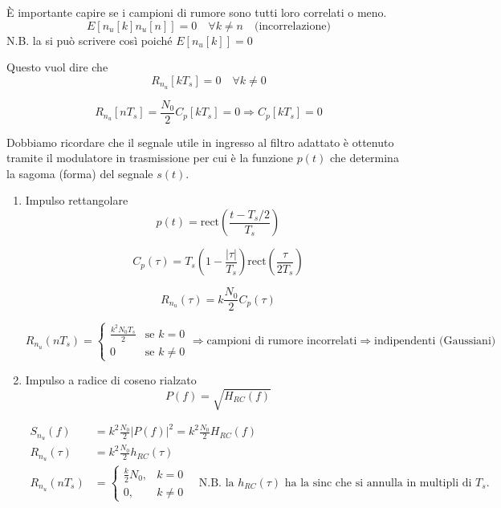 \documentclass{article}
\begin{document}
È importante capire se i campioni di rumore sono tutti loro correlati o meno.
\[
E[n_u[k]n_u[n]] = 0 \quad \forall k \neq n \quad \text{(incorrelazione)}
\]
N.B. la si può scrivere così poiché
\(E[n_u[k]] = 0\)

Questo vuol dire che
\[
R_{n_u}[kT_s] = 0 \quad \forall k \neq 0
\]

\[
R_{n_u}[nT_s] = \frac{N_0}{2} C_p[kT_s] = 0 \Rightarrow C_p[kT_s] = 0
\]


Dobbiamo ricordare che il segnale utile in ingresso al filtro adattato è ottenuto tramite il modulatore in trasmissione per cui è la funzione \( p(t) \) che determina la sagoma (forma) del segnale \( s(t) \).

\begin{enumerate}
  \item Impulso rettangolare
  \[
  p(t) = \text{rect}\left(\frac{t-T_s/2}{T_s}\right)
  \]

  \[
  C_p(\tau) = T_s \left(1 - \frac{|\tau|}{T_s}\right) \text{rect}\left(\frac{\tau}{2T_s}\right)
  \]

  \[
  R_{n_u}(\tau) = k \frac{N_0}{2} C_p(\tau)
  \]

  \[
  R_{n_u}(nT_s) =
  \begin{cases}
    \frac{k^2 N_0 T_s}{2} & \text{se } k = 0\\
    0 & \text{se } k \neq 0
  \end{cases}
  \Rightarrow
  \text{campioni di rumore incorrelati} \Rightarrow \text{indipendenti (Gaussiani)}
  \]
  \begin{center}
   
  \end{center}
  \item Impulso a radice di coseno rialzato
  \[
  P(f) = \sqrt{H_{RC}(f)}
  \]
  
    \begin{align*}
    S_{n_u}(f) &= k^2 \frac{N_0}{2} |P(f)|^2 = k^2 \frac{N_0}{2} H_{RC}(f) \\
    R_{n_u}(\tau) &= k^2 \frac{N_0}{2} h_{RC}(\tau) \\
    R_{n_u}(nT_s) &= \begin{cases}
    \frac{k}{2} N_0, & k = 0 \\
    0, & k \neq 0
    \end{cases} \quad
    \text{N.B. la $h_{RC}(\tau)$ ha la sinc che si annulla in multipli di $T_s$.}
    \end{align*}
    
\end{enumerate}
\end{document}

